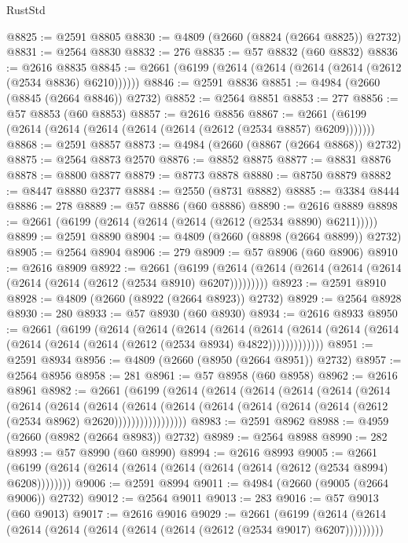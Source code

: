 \begin{lexlean}{RustStd}
\begin{coremodule}
@8825 := @2591 @8805
@8830 := @4809 (@2660 (@8824 (@2664 @8825)) @2732)
@8831 := @2564 @8830
@8832 := 276
@8835 := @57 @8832 (@60 @8832)
@8836 := @2616 @8835
@8845 := @2661 (@6199 (@2614 (@2614 (@2614 (@2614 (@2612 (@2534 @8836) @6210))))))
@8846 := @2591 @8836
@8851 := @4984 (@2660 (@8845 (@2664 @8846)) @2732)
@8852 := @2564 @8851
@8853 := 277
@8856 := @57 @8853 (@60 @8853)
@8857 := @2616 @8856
@8867 := @2661 (@6199 (@2614 (@2614 (@2614 (@2614 (@2614 (@2612 (@2534 @8857) @6209)))))))
@8868 := @2591 @8857
@8873 := @4984 (@2660 (@8867 (@2664 @8868)) @2732)
@8875 := @2564 @8873 @2570
@8876 := @8852 @8875
@8877 := @8831 @8876
@8878 := @8800 @8877
@8879 := @8773 @8878
@8880 := @8750 @8879
@8882 := @8447 @8880 @2377
@8884 := @2550 (@8731 @8882)
@8885 := @3384 @8444
@8886 := 278
@8889 := @57 @8886 (@60 @8886)
@8890 := @2616 @8889
@8898 := @2661 (@6199 (@2614 (@2614 (@2614 (@2612 (@2534 @8890) @6211)))))
@8899 := @2591 @8890
@8904 := @4809 (@2660 (@8898 (@2664 @8899)) @2732)
@8905 := @2564 @8904
@8906 := 279
@8909 := @57 @8906 (@60 @8906)
@8910 := @2616 @8909
@8922 := @2661
    (@6199 (@2614 (@2614 (@2614 (@2614 (@2614 (@2614 (@2614 (@2612 (@2534 @8910) @6207)))))))))
@8923 := @2591 @8910
@8928 := @4809 (@2660 (@8922 (@2664 @8923)) @2732)
@8929 := @2564 @8928
@8930 := 280
@8933 := @57 @8930 (@60 @8930)
@8934 := @2616 @8933
@8950 := @2661
    (@6199
      (@2614
        (@2614
          (@2614
            (@2614
              (@2614
                (@2614 (@2614 (@2614 (@2614 (@2614 (@2614 (@2612 (@2534 @8934) @4822)))))))))))))
@8951 := @2591 @8934
@8956 := @4809 (@2660 (@8950 (@2664 @8951)) @2732)
@8957 := @2564 @8956
@8958 := 281
@8961 := @57 @8958 (@60 @8958)
@8962 := @2616 @8961
@8982 := @2661
    (@6199
      (@2614
        (@2614
          (@2614
            (@2614
              (@2614
                (@2614
                  (@2614
                    (@2614
                      (@2614
                        (@2614
                          (@2614
                            (@2614 (@2614 (@2614 (@2614 (@2612 (@2534 @8962) @2620)))))))))))))))))
@8983 := @2591 @8962
@8988 := @4959 (@2660 (@8982 (@2664 @8983)) @2732)
@8989 := @2564 @8988
@8990 := 282
@8993 := @57 @8990 (@60 @8990)
@8994 := @2616 @8993
@9005 := @2661 (@6199 (@2614 (@2614 (@2614 (@2614 (@2614 (@2614 (@2612 (@2534 @8994) @6208))))))))
@9006 := @2591 @8994
@9011 := @4984 (@2660 (@9005 (@2664 @9006)) @2732)
@9012 := @2564 @9011
@9013 := 283
@9016 := @57 @9013 (@60 @9013)
@9017 := @2616 @9016
@9029 := @2661
    (@6199 (@2614 (@2614 (@2614 (@2614 (@2614 (@2614 (@2614 (@2612 (@2534 @9017) @6207)))))))))

\end{coremodule}
\end{lexlean}
